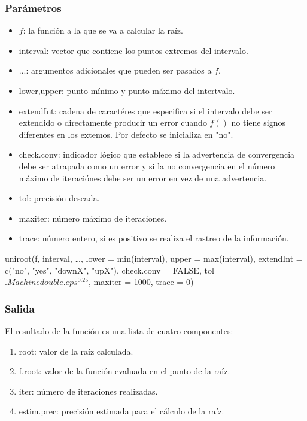 \documentclass[a4paper,12pt]{article}
\begin{document}
\subsubsection{Parámetros}
 \begin{itemize}
    \item $f$: la función a la que se va a calcular la raíz.
    \item interval: vector que contiene los puntos extremos del intervalo.
    \item ...: argumentos adicionales que pueden ser pasados a $f$.
    \item lower,upper: punto mínimo y punto máximo del intertvalo.
    \item extendInt: cadena de caractéres que especifica si el intervalo debe ser extendido o directamente producir un error cuando $f()$ no tiene signos diferentes en los extemos. Por defecto se inicializa en "no".
    \item check.conv: indicador lógico que establece si la advertencia de convergencia debe ser atrapada como un error y si la no convergencia en el número máximo de iteraciónes debe ser un error en vez de una advertencia.
    \item tol: precisión deseada.
    \item maxiter: número máximo de iteraciones.
    \item trace: número entero, si es positivo se realiza el rastreo de la información.
\end{itemize}

 uniroot(f, interval, …,
        lower = min(interval), upper = max(interval),
        extendInt = c("no", "yes", "downX", "upX"), check.conv = FALSE,
        tol = $.Machinedouble.eps^{0.25}$, maxiter = 1000, trace = 0)

\subsubsection{Salida}
El resultado de la función es una lista de cuatro componentes:
\begin{enumerate}
    \item root: valor de la raíz calculada.
    \item f.root: valor de la función evaluada en el punto de la raíz.
    \item iter: número de iteraciones realizadas.
    \item estim.prec: precisión estimada para el cálculo de la raíz.
\end{enumerate}
\end{document}
